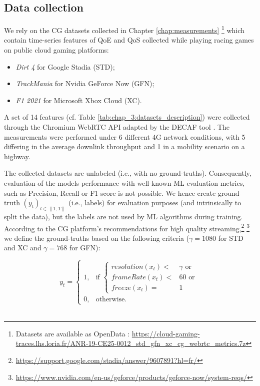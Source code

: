 \subsection{Data collection}
We rely on the CG datasets collected in Chapter \ref{chap:measurements} \footnote{Datasets are available as OpenData : \url{https://cloud-gaming-traces.lhs.loria.fr/ANR-19-CE25-0012_std_gfn_xc_cg_webrtc_metrics.7z}} which contain time-series features of QoE and QoS collected while playing racing games on public cloud gaming platforms:
\begin{itemize}
    \item \textit{Dirt 4} for Google Stadia (STD);
    \item \textit{TrackMania} for Nvidia GeForce Now (GFN);
    \item \textit{F1 2021} for Microsoft Xbox Cloud (XC).
\end{itemize}
A set of 14 features (cf. Table \ref{tab:chap_3:datasets_description}) were collected through the Chromium WebRTC API adapted by the DECAF tool \cite{Iqbal2021DissectingCG}. The measurements were performed under 6 different 4G network conditions, with 5 differing in the average downlink throughput and 1 in a mobility scenario on a highway. 

The collected datasets are unlabeled (i.e., with no ground-truths). Consequently, evaluation of the models performance with well-known ML evaluation metrics, such as Precision, Recall or F1-score is not possible. We hence create ground-truth $(y_t)_{t\in \|1,T\|}$ (i.e., labels) for evaluation purposes (and intrinsically to split the data), but the labels are not used by ML algorithms during training. According to the CG platform's recommendations for high quality streaming,\footnote{\url{https://support.google.com/stadia/answer/9607891?hl=fr/}} \footnote{\url{https://www.nvidia.com/en-us/geforce/products/geforce-now/system-reqs/}} we define the ground-truths based on the following criteria ($\gamma = 1080$ for STD and XC and $\gamma = 768$ for GFN):

\begin{equation}
    y_t = 
    \begin{cases}
       1, & \text{if } \begin{cases}
                            resolution(x_t) <& \gamma \text{ or}  \\
                            frameRate(x_t)  <& 60 \text{ or} \\
                            freeze(x_t) =& 1 
                        \end{cases} \\
       0, & \text{otherwise.}
    \end{cases}
\end{equation}
\\


